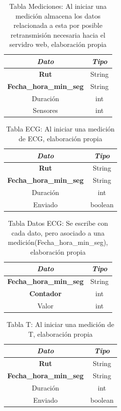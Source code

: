 \begin{table}[H]
	\centering
	\begin{tabular}{| c | c |}
		\hline
		\multicolumn{1}{|c|}{\textit{Dato}}&
		\multicolumn{1}{c|}{\textit{Tipo}}\\ \hline
		\textbf{Rut}  & String   \\ \hline
		\textbf{Fecha\_hora\_min\_seg}  & String  \\ \hline
		Duración & int  \\ \hline
		Sensores & int  \\ \hline
	\end{tabular}
	\caption{Tabla Mediciones: Al iniciar una medición almacena los datos relacionada a esta por posible retransmisión necesaria hacia el servidro web, elaboración propia}
	\label{tabla_mediciones}
\end{table}

\begin{table}[H]
	\centering
	\begin{tabular}{| c | c |}
		\hline
		\multicolumn{1}{|c|}{\textit{Dato}}&
		\multicolumn{1}{c|}{\textit{Tipo}}\\ \hline
		\textbf{Rut}  & String   \\ \hline
		\textbf{Fecha\_hora\_min\_seg}  & String  \\ \hline
		Duración & int  \\ \hline
		Enviado & boolean  \\ \hline
	\end{tabular}
	\caption{Tabla ECG: Al iniciar una medición de ECG, elaboración propia}
	\label{tabla_ECG}
\end{table}

\begin{table}[H]
	\centering
	\begin{tabular}{| c | c |}
		\hline
		\multicolumn{1}{|c|}{\textit{Dato}}&
		\multicolumn{1}{c|}{\textit{Tipo}}\\ \hline
		\textbf{Fecha\_hora\_min\_seg}  & String  \\ \hline
		\textbf{Contador}  & int  \\ \hline
		Valor & int  \\ \hline
	\end{tabular}
	\caption{Tabla Datos ECG: Se escribe con cada dato, pero asociado a una medición(Fecha\_hora\_min\_seg), elaboración propia}
	\label{tabla_datos_ECG}
\end{table}

\begin{table}[H]
	\centering
	\begin{tabular}{| c | c |}
		\hline
		\multicolumn{1}{|c|}{\textit{Dato}}&
		\multicolumn{1}{c|}{\textit{Tipo}}\\ \hline
		\textbf{Rut}  & String   \\ \hline
		\textbf{Fecha\_hora\_min\_seg}  & String  \\ \hline
		Duración & int  \\ \hline
		Enviado & boolean  \\ \hline
	\end{tabular}
	\caption{Tabla T: Al iniciar una medición de T, elaboración propia}
	\label{tabla_T}
\end{table}

